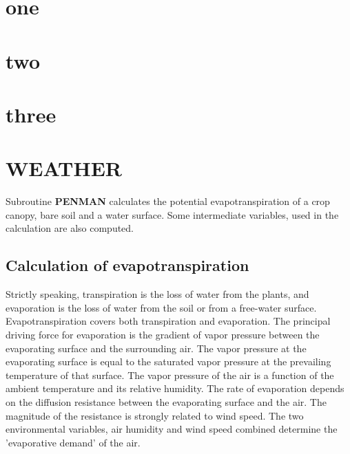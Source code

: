 \documentclass[11pt]{report}
\begin{document}
\chapter{one}
\chapter{two}
\chapter{three}
\chapter{WEATHER}

Subroutine {\bf PENMAN} calculates the potential evapotranspiration of a crop canopy, bare
soil and a water surface. Some intermediate variables, used in the calculation are also
computed.

\section{Calculation of evapotranspiration}

Strictly speaking, transpiration is the loss of water from the plants, and evaporation is the
loss of water from the soil or from a free-water surface. Evapotranspiration covers both
transpiration and evaporation.
The principal driving force for evaporation is the gradient of vapor pressure between the
evaporating surface and the surrounding air. The vapor pressure at the evaporating
surface is equal to the saturated vapor pressure at the prevailing temperature of that
surface. The vapor pressure of the air is a function of the ambient temperature and its
relative humidity. The rate of evaporation depends on the diffusion resistance between the
evaporating surface and the air.
The magnitude of the resistance is strongly related to wind speed. The two environ\-mental
variables, air humidity and wind speed combined determine the 'evaporative demand' of
the air.
\end{document}
